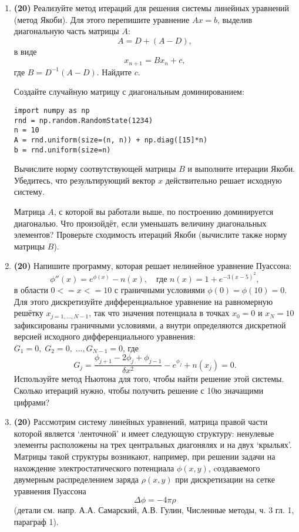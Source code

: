 \documentclass[prb,papersize=a4paper,notitlepage]{revtex4-1}%
\begin{document}
\begin{enumerate}
\item \textbf{(20)}
Реализуйте метод итераций для решения системы линейных уравнений (метод Якоби). Для этого перепишите уравнение $Ax=b$, выделив диагональную часть матрицы $A$:
$$
A = D + (A - D),
$$ в виде
$$
x_{n+1}=B x_n + c,
$$
где $B = D^{-1}(A-D)$. Найдите $c$.

Создайте случайную матрицу с диагональным доминированием:
\lstset{language=Python}
\lstset{frame=lines}
\lstset{basicstyle=\ttfamily}
\begin{lstlisting}
import numpy as np
rnd = np.random.RandomState(1234)
n = 10
A = rnd.uniform(size=(n, n)) + np.diag([15]*n)
b = rnd.uniform(size=n)
\end{lstlisting}
Вычислите норму соотвутствующей матрицы $B$ и выполните итерации Якоби. Убедитесь, что результирующий вектор $x$ действительно решает исходную систему.

Матрица $A$, с которой вы работали выше, по построению доминируется диагональю. Что произойдёт, если уменьшать величину диагональных элементов? Проверьте сходимость итераций Якоби (вычислите также норму матрицы $B$).

\item \textbf{(20)}
Напишите программу, которая решает нелинейное уравнение Пуассона:
$$
\phi''(x)=e^{\phi(x)} - n(x),\quad\textrm{где }n(x)=1+e^{-3(x-5)^2},
$$
в области $0<=x<=10$ с граничными условиями $\phi(0)=\phi(10)=0$. Для этого дискретизуйте дифференциальное уравнение на равномерную решётку
$x_{j=1,...,N-1}$, так что значения потенциала в точках $x_0=0$ и $x_{N}=10$ зафиксированы граничными условиями, а внутри определяются дискретной версией исходного дифференциального уравнения:  $G_1=0,\;G_2=0,\;...,G_{N-1}=0$, где
$$
G_j=\frac{\phi_{j+1}-2\phi_j+\phi_{j-1}}{\delta x^2} - e^{\phi_j} + n(x_j)=0.
$$
Используйте метод Ньютона для того, чтобы найти решение этой системы. Сколько итераций нужно, чтобы получить решение с 10ю значащими цифрами?

\item \textbf{(20)}
Рассмотрим систему линейных уравнений, матрица правой части которой является `ленточной' и имеет следующую структуру: ненулевые элементы расположены на трех центральных диагонялях и на двух `крыльях'. Матрицы такой структуры возникают, например, при решении задачи на нахождение электростатического потенциала $\phi(x, y)$, cоздаваемого двумерным распределением заряда $\rho(x, y)$ при дискретизации на сетке уравнения Пуассона
$$ \Delta \phi = -4\pi \rho$$ (детали см. напр. А.А. Самарский, А.В. Гулин, Численные методы, ч. 3 гл. 1, параграф 1). 


\end{enumerate}
\end{document}
